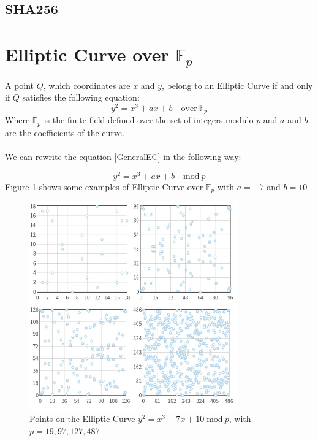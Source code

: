 \subsection{SHA256}


\section{Elliptic Curve over $\mathbb{F}_p$}

A point $Q$, which coordinates are $x$ and $y$, belong to an Elliptic Curve if and only if $Q$ satisfies the following equation:
\begin{equation}\label{GeneralEC}
y^2=x^3+ax+b \quad \textrm{over} \ \mathbb{F}_p
\end{equation}
Where $\mathbb{F}_p$ is the finite field defined over the set of integers modulo $p$ and $a$ and $b$ are the coefficients of the curve. \\ \\
We can rewrite the equation \ref{GeneralEC} in the following way:

\begin{equation}\label{GeneralECmodp}
y^2=x^3+ax+b \quad \textrm{mod} \ p
\end{equation}
Figure \ref{fig:EC_ex} shows some examples of Elliptic Curve over $\mathbb{F}_p$ with $a=-7$ and $b=10$
\begin{figure}[ht!]
	\centering
	\includegraphics[width=9cm]{Figures/EC_ex.jpg}
	\caption{Points on the Elliptic Curve $y^2=x^3-7x+10 \; \textrm{mod} \ p$, with $p=19,97,127,487$ }
	\label{fig:EC_ex}
\end{figure}






